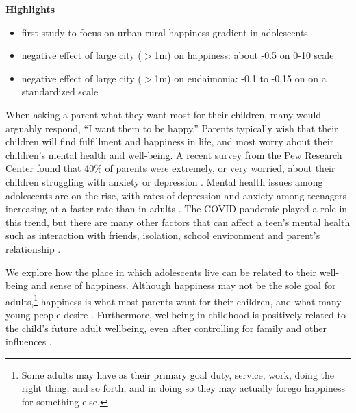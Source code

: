 \documentclass[11pt, letterpaper]{article}
\newcommand{\emd}[1]{\ExecuteMetaData[/tmp/tex]{#1}} %
\begin{document}
\begin{spacing}{1.9} %

\textbf{Highlights}

\begin{itemize}
\item first study to focus on urban-rural happiness gradient in adolescents
\item negative effect  of large city ($>$1m) on happiness: about -0.5 on
  0-10 scale
\item negative effect  of large city ($>$1m)  on eudaimonia: -0.1 to -0.15 on %
 on a standardized scale
\end{itemize}





\noindent 

When asking a parent what they want most for their children, many would arguably
respond, ``I want them to be happy.'' Parents typically wish that their children
will find fulfillment and happiness in life, and most worry about their
children's 
mental health and well-being. A recent survey from the Pew Research Center found
that 40\% of parents were extremely, or very worried, about their children
struggling with anxiety or depression \citep{pew}. Mental health issues among
adolescents are on the rise, with rates of depression and anxiety among
teenagers increasing at a faster rate than in adults \citep{cdc}. The COVID
pandemic  played a role in this trend, but there are many other factors that can
affect a teen's mental health such as interaction with friends, isolation,
school environment and parent's relationship \citep{twenge12,twenge14,twenge15,twengeATL17sep}. 

We explore how the place in which adolescents live can be related to their
well-being and sense of happiness. Although happiness may not be the sole goal
for adults,\footnote{Some adults may have as their primary goal duty, service, work, doing the
  right thing, and so forth, and in doing so they may actually forego happiness
  for something else.} happiness is what most parents want for their children, and what many young people desire \citep{humphrey2023}. Furthermore, wellbeing in childhood is positively related to the child's future adult
 wellbeing, even after controlling for family and other influences
 \citep{de2012estimating}. 
 


\end{spacing}
\end{document}
